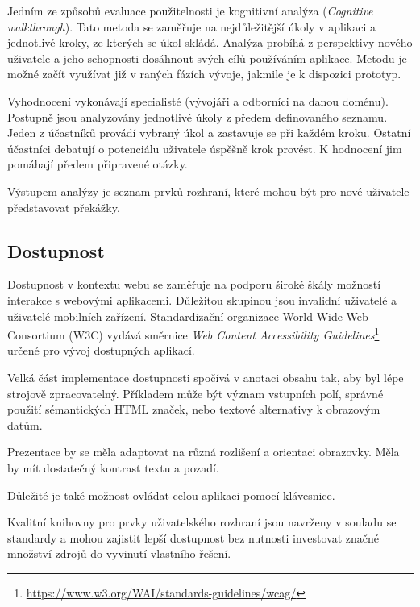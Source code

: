 Jedním ze způsobů evaluace použitelnosti je kognitivní analýza (\emph{Cognitive walkthrough}).
Tato metoda se zaměřuje na nejdůležitější úkoly v aplikaci a jednotlivé kroky, ze kterých se úkol skládá.
Analýza probíhá z perspektivy nového uživatele a jeho schopnosti dosáhnout svých cílů používáním aplikace.
Metodu je možné začít využívat již v raných fázích vývoje, jakmile je k dispozici prototyp.
\cite{cognitiveWalkthrough}

Vyhodnocení vykonávají specialisté (vývojáři a odborníci na danou doménu).
Postupně jsou analyzovány jednotlivé úkoly z předem definovaného seznamu.
Jeden z účastníků provádí vybraný úkol a zastavuje se při každém kroku.
Ostatní účastníci debatují o potenciálu uživatele úspěšně krok provést.
K hodnocení jim pomáhají předem připravené otázky.

Výstupem analýzy je seznam prvků rozhraní, které mohou být pro nové uživatele představovat překážky.

\subsection{Dostupnost}

Dostupnost v kontextu webu se zaměřuje na podporu široké škály možností interakce s webovými aplikacemi.
Důležitou skupinou jsou invalidní uživatelé a uživatelé mobilních zařízení.
Standardizační organizace World Wide Web Consortium (W3C) vydává směrnice \emph{Web Content Accessibility Guidelines}\footnote{\href{https://www.w3.org/WAI/standards-guidelines/wcag/}{https://www.w3.org/WAI/standards-guidelines/wcag/}} určené pro vývoj dostupných aplikací.

Velká část implementace dostupnosti spočívá v anotaci obsahu tak, aby byl lépe strojově zpracovatelný.
Příkladem může být význam vstupních polí, správné použití sémantických HTML značek, nebo textové alternativy k obrazovým datům.

Prezentace by se měla adaptovat na různá rozlišení a orientaci obrazovky.
Měla by mít dostatečný kontrast textu a pozadí.

Důležité je také možnost ovládat celou aplikaci pomocí klávesnice.

Kvalitní knihovny pro prvky uživatelského rozhraní jsou navrženy v souladu se standardy a mohou zajistit lepší dostupnost bez nutnosti investovat značné množství zdrojů do vyvinutí vlastního řešení.

